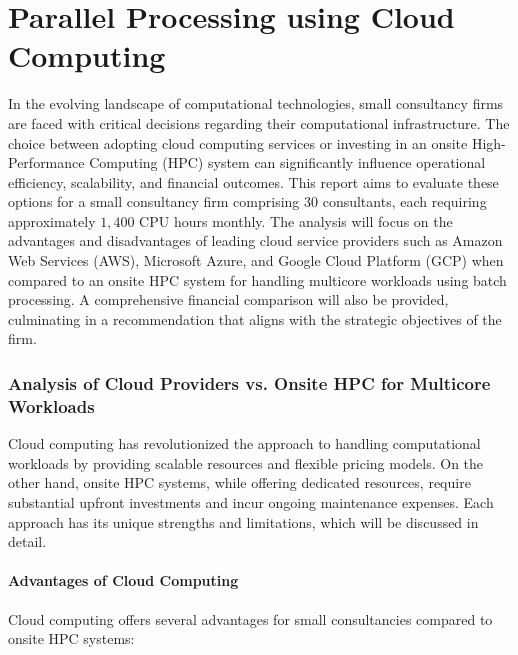 \documentclass{article}
\begin{document}
\begin{cwauthorlist}
\end{cwauthorlist}

\part{Parallel Processing using Cloud Computing}

In the evolving landscape of computational technologies, small consultancy firms are faced with critical decisions regarding their computational infrastructure. The choice between adopting cloud computing services or investing in an onsite High-Performance Computing (HPC) system can significantly influence operational efficiency, scalability, and financial outcomes. This report aims to evaluate these options for a small consultancy firm comprising $30$ consultants, each requiring approximately $1,400$ CPU hours monthly. The analysis will focus on the advantages and disadvantages of leading cloud service providers such as Amazon Web Services (AWS), Microsoft Azure, and Google Cloud Platform (GCP) when compared to an onsite HPC system for handling multicore workloads using batch processing. A comprehensive financial comparison will also be provided, culminating in a recommendation that aligns with the strategic objectives of the firm.

\section{Analysis of Cloud Providers vs. Onsite HPC for Multicore Workloads}

Cloud computing has revolutionized the approach to handling computational workloads by providing scalable resources and flexible pricing models. On the other hand, onsite HPC systems, while offering dedicated resources, require substantial upfront investments and incur ongoing maintenance expenses. Each approach has its unique strengths and limitations, which will be discussed in detail.

\subsection{Advantages of Cloud Computing}

Cloud computing offers several advantages for small consultancies compared to onsite HPC systems:
\end{document}
